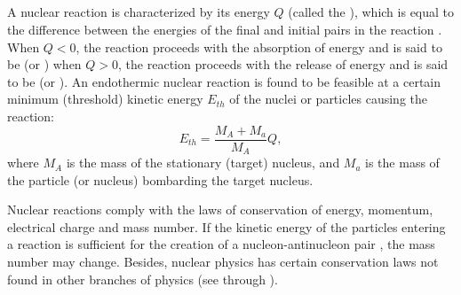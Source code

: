 \subsection{}\label{42.9.2} A nuclear reaction is characterized by its energy $Q$ (called the ), which is equal to the difference
between the energies of the final and initial pairs in the reaction . When $Q < 0$, the reaction proceeds with the absorption of energy and is said to be  (or ) when $Q > 0$, the reaction proceeds with the release of energy and is said to be  (or ). An endothermic nuclear reaction is found to be feasible at a certain minimum (threshold) kinetic energy $E_{th}$ of the nuclei or particles causing the reaction:
\begin{equation*}%
E_{th} = \frac{M_{A}+ M_{a}}{M_{A}}Q,
\end{equation*}
where $M_{A}$ is the mass of the stationary (target) nucleus, and $M_{a}$ is the mass of the particle (or nucleus) bombarding the target nucleus. 

Nuclear reactions comply with the laws of conservation of energy, momentum, electrical charge and mass number. If the kinetic energy of the particles entering a reaction is sufficient for the creation of a nucleon-antinucleon pair , the mass number may change. Besides, nuclear physics has certain conservation laws not found in other branches of physics (see  through ).

